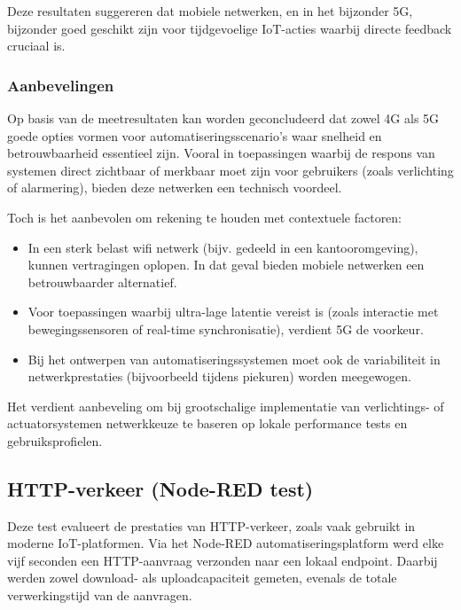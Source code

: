 Deze resultaten suggereren dat mobiele netwerken, en in het bijzonder 5G, bijzonder goed geschikt zijn voor tijdgevoelige IoT-acties waarbij directe feedback cruciaal is.

\subsubsection{Aanbevelingen}
Op basis van de meetresultaten kan worden geconcludeerd dat zowel 4G als 5G goede opties vormen voor automatiseringsscenario’s waar snelheid en betrouwbaarheid essentieel zijn. Vooral in toepassingen waarbij de respons van systemen direct zichtbaar of merkbaar moet zijn voor gebruikers (zoals verlichting of alarmering), bieden deze netwerken een technisch voordeel.

Toch is het aanbevolen om rekening te houden met contextuele factoren:
\begin{itemize}
    \item In een sterk belast wifi netwerk (bijv. gedeeld in een kantooromgeving), kunnen vertragingen oplopen. In dat geval bieden mobiele netwerken een betrouwbaarder alternatief.
    \item Voor toepassingen waarbij ultra-lage latentie vereist is (zoals interactie met bewegingssensoren of real-time synchronisatie), verdient 5G de voorkeur.
    \item Bij het ontwerpen van automatiseringssystemen moet ook de variabiliteit in netwerkprestaties (bijvoorbeeld tijdens piekuren) worden meegewogen.
\end{itemize}

Het verdient aanbeveling om bij grootschalige implementatie van verlichtings- of actuatorsystemen netwerkkeuze te baseren op lokale performance tests en gebruiksprofielen.

\subsection{HTTP-verkeer (Node-RED test)}

Deze test evalueert de prestaties van HTTP-verkeer, zoals vaak gebruikt in moderne IoT-platformen. Via het Node-RED automatiseringsplatform werd elke vijf seconden een HTTP-aanvraag verzonden naar een lokaal endpoint. Daarbij werden zowel download- als uploadcapaciteit gemeten, evenals de totale verwerkingstijd van de aanvragen.

